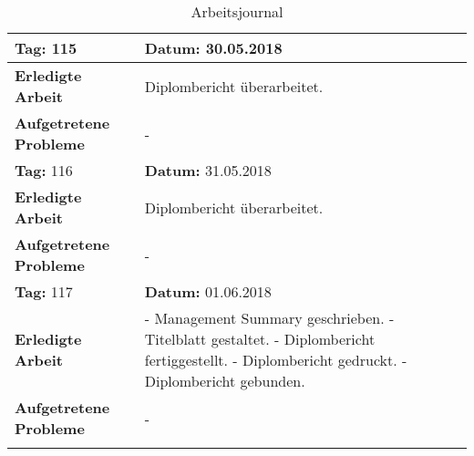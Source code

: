 \begin{longtable}{|p{5cm}|p{5cm}p{6cm}|}
\rowcolor{heading}\textbf{Tag:} 115 & \textbf{Datum:} 30.05.2018 & \\ \hline
\textbf{Erledigte Arbeit} & \multicolumn{2}{p{11cm}|}{Diplombericht überarbeitet.} \\ \hline
\textbf{Aufgetretene Probleme} & \multicolumn{2}{p{11cm}|}{-} \\ \hline
\rowcolor{heading}\textbf{Tag:} 116 & \textbf{Datum:} 31.05.2018 & \\ \hline
\textbf{Erledigte Arbeit} & \multicolumn{2}{p{11cm}|}{Diplombericht überarbeitet.} \\ \hline
\textbf{Aufgetretene Probleme} & \multicolumn{2}{p{11cm}|}{-} \\ \hline
\rowcolor{heading}\textbf{Tag:} 117 & \textbf{Datum:} 01.06.2018 & \\ \hline
\textbf{Erledigte Arbeit} & \multicolumn{2}{p{11cm}|}{- Management Summary geschrieben. \newline
- Titelblatt gestaltet. \newline
- Diplombericht fertiggestellt. \newline
- Diplombericht gedruckt. \newline
- Diplombericht gebunden.} \\ \hline
\textbf{Aufgetretene Probleme} & \multicolumn{2}{p{11cm}|}{-} \\ \hline
\caption{Arbeitsjournal}\\
\end{longtable}


